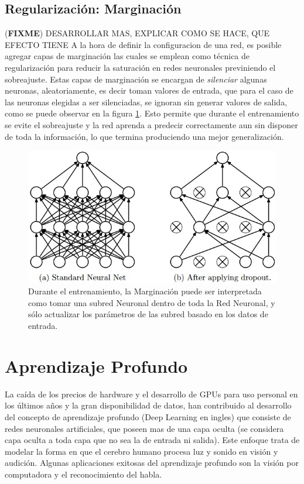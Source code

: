 \documentclass[a4paper,11pt,spanish]{book}
\newcommand*{\FIXME}[1]{{(\textbf{FIXME}) {#1}}}
\begin{document}
      \subsection {Regularización: Marginación}
	\FIXME{DESARROLLAR MAS, EXPLICAR COMO SE HACE, QUE EFECTO TIENE}
	A la hora de definir la configuracion de una red, es posible agregar capas de marginación las cuales se emplean como 
	técnica de regularización para reducir la saturación en redes neuronales previniendo el sobreajuste. Estas capas de marginación se encargan de 
	\emph{silenciar} algunas neuronas, aleatoriamente, es decir toman valores de entrada, que para el caso de las neuronas elegidas a ser silenciadas, se ignoran
	sin generar valores de salida, como se puede observar en la figura \ref{fig:dropout}. Esto permite que durante el entrenamiento se evite el sobreajuste y la red aprenda 
	a predecir correctamente aun sin disponer de toda la información, lo que termina produciendo una mejor generalización.
	\begin{figure}[H]
	  \begin{center}
	   \includegraphics[width=0.6\linewidth]{./img/dropout.jpeg}
	  \end{center}
	  \caption{Durante el entrenamiento, la Marginación puede ser interpretada como tomar una subred Neuronal dentro de toda la Red Neuronal, y sólo actualizar los parámetros
	  de las subred basado en los datos de entrada. \cite{Srivastava:Dropout} }
	  \label{fig:dropout}
	\end{figure}

  \section {Aprendizaje Profundo}
    La caída de los precios de hardware y el desarrollo de GPUs para uso personal en los últimos años y la gran disponibilidad de datos, han contribuido al desarrollo del
    concepto de aprendizaje profundo (Deep Learning en ingles)
    que consiste de redes neuronales artificiales, que poseen mas de una capa oculta (se considera capa oculta a toda capa que no sea la de entrada ni salida). Este enfoque trata de
    modelar la forma en que el cerebro humano procesa luz y sonido en visión y audición.
    Algunas aplicaciones exitosas del aprendizaje profundo son la visión por computadora y el reconocimiento del habla.
\end{document}
